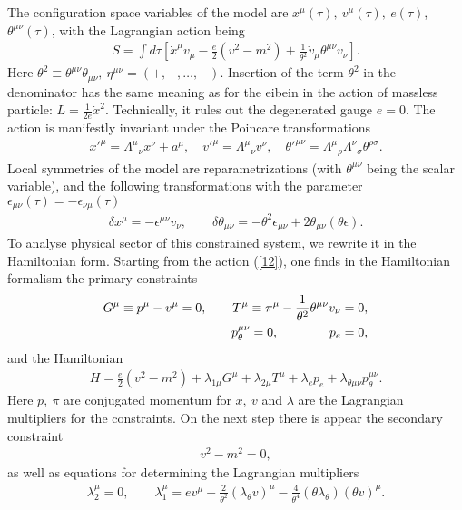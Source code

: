 \documentclass[paper a4]{article}
\begin{document}
The configuration space variables of the model
are $x^\mu(\tau), ~ v^\mu(\tau), ~ e(\tau)$, $\theta^{\mu\nu}(\tau)$,
with the Lagrangian action being
\begin{eqnarray}\label{12}
S=\int d\tau\left[\dot x^\mu v_\mu-\frac{e}{2}(v^2-m^2)+
\frac{1}{\theta^2}\dot v_\mu\theta^{\mu\nu}v_\nu\right].
\end{eqnarray}
Here $\theta^2\equiv\theta^{\mu\nu}\theta_{\mu\nu}, ~ \eta^{\mu\nu}=
(+,-, \ldots ,-)$. Insertion of the term $\theta^2$
in the denominator has the same meaning as for the eibein in
the action of massless particle: $L=\frac{1}{2e}\dot x^2$. Technically,
it rules out the degenerated gauge $e=0$. The action is manifestly
invariant under the Poincare transformations
\begin{eqnarray}\label{13}
x'^\mu=\Lambda^\mu{}_\nu x^\nu+a^\mu, \quad v'^\mu=\Lambda^\mu{}_\nu
v^\nu, \quad
\theta '^{\mu\nu}=\Lambda^\mu{}_\rho\Lambda^\nu{}_\sigma
\theta^{\rho\sigma}.
\end{eqnarray}
Local symmetries of the model are reparametrizations (with
$\theta^{\mu\nu}$ being the scalar variable), and the following
transformations with the parameter $\epsilon_{\mu\nu}(\tau)=-
\epsilon_{\nu\mu}(\tau)$
\begin{eqnarray}\label{14}
\delta x^\mu=-\epsilon^{\mu\nu}v_\nu, \qquad
\delta\theta_{\mu\nu}=-\theta^2\epsilon_{\mu\nu}+
2\theta_{\mu\nu}(\theta\epsilon).
\end{eqnarray}
To analyse physical sector of this constrained system, we rewrite
it in the Hamiltonian form.
Starting from the action (\ref{12}), one finds in the Hamiltonian
formalism the primary constraints
\begin{eqnarray}\label{15}
G^\mu\equiv p^\mu-v^\mu=0, \qquad
T^\mu\equiv\pi^\mu-\frac{1}{\theta^2}\theta^{\mu\nu}v_\nu=0, \cr
p_{\theta}^{\mu\nu}=0, \qquad \qquad p_e=0,
\end{eqnarray}
and the Hamiltonian
\begin{eqnarray}\label{16}
H=\frac{e}{2}(v^2-m^2)+\lambda_{1\mu}G^\mu+\lambda_{2\mu}T^\mu+
\lambda_ep_e+\lambda_{\theta\mu\nu}p_{\theta}^{\mu\nu}.
\end{eqnarray}
Here $p, ~ \pi$ are conjugated momentum for $x, ~ v$ and $\lambda$ are the
Lagrangian multipliers for the constraints. On the next step there is
appear the secondary constraint
\begin{eqnarray}\label{17}
v^2-m^2=0,
\end{eqnarray}
as well as equations for determining the Lagrangian multipliers
\begin{eqnarray}\label{18}
\lambda_2^\mu=0, \qquad
\lambda_1^\mu=ev^\mu+\frac{2}{\theta^2}(\lambda_\theta v)^\mu-
\frac{4}{\theta^4}(\theta\lambda_{\theta})(\theta v)^\mu.
\end{eqnarray}
\end{document}
